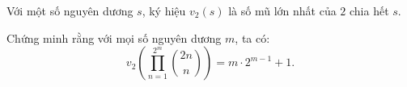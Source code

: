 \ifshowproblem
\begin{problem}\label{example:BMO-2015-P5}
    Với một số nguyên dương \( s \), ký hiệu \( v_2(s) \) là số mũ lớn nhất của \( 2 \) chia hết \( s \).

    Chứng minh rằng với mọi số nguyên dương \( m \), ta có:
    \[
        v_2\left( \prod_{n=1}^{2^m} \binom{2n}{n} \right) = m \cdot 2^{m-1} + 1.
    \]
\end{problem}
\fi

\footnotemark
{}
\fi